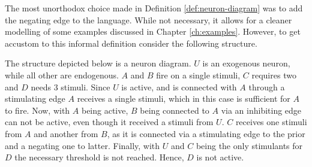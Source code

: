 \documentclass[11pt,a4paper]{book}
\theoremstyle{definition}
\theoremstyle{definition}
\theoremstyle{definition}
\theoremstyle{remark}
\begin{document}
The most unorthodox choice made in Definition \ref{def:neuron-diagram} was to add the negating edge to the language. While not necessary, it allows for a cleaner modelling of some examples discussed in Chapter \ref{ch:examples}.
However, to get accustom to this informal definition consider the following structure.
\begin{center}
\end{center}

The structure depicted below is a neuron diagram. $U$ is an exogenous neuron, while all other are endogenous.
$A$ and $B$ fire on a single stimuli, $C$ requires two and $D$ needs $3$ stimuli. 
Since $U$ is active, and is connected with $A$ through a stimulating edge $A$ receives a single stimuli, which in this case is sufficient for $A$ to fire.
Now, with $A$ being active, $B$ being connected to $A$ via an inhibiting edge can not be active, even though it received a stimuli from $U$.
$C$ receives one stimuli from $A$ and another from $B$, as it is connected via a stimulating edge to the prior and a negating one to latter.
Finally, with $U$ and $C$ being the only stimulants for $D$ the necessary threshold is not reached. Hence, $D$ is not active.\bigskip
\end{document}
